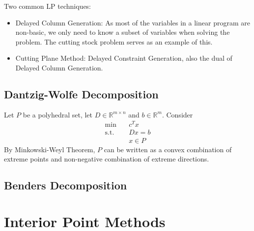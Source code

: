 \documentclass{article}
\theoremstyle{definition}
\begin{document}
	\noindent Two common LP techniques:
	\begin{itemize}
	    \item Delayed Column Generation: As most of the variables in a linear program are non-basic, we only need to know a subset of variables when solving the problem. The cutting stock problem serves as an example of this.
	    \item Cutting Plane Method: Delayed Constraint Generation, also the dual of Delayed Column Generation.
	\end{itemize}

	\subsection{Dantzig-Wolfe Decomposition}
	\noindent Let $P$ be a polyhedral set, let $D \in \mathbb{R}^{m \times n}$ and $b \in \mathbb{R}^m$. Consider
    \begin{align*}	
		\text{min} \quad& c^T x\\
		\text{s.t.} \quad& Dx = b \\
		\quad& x \in P
    \end{align*}
    By Minkowski-Weyl Theorem, $P$ can be written as a convex combination of extreme points and non-negative combination of extreme directions.
	
	\subsection{Benders Decomposition}
	
	\section{Interior Point Methods}
\end{document}
